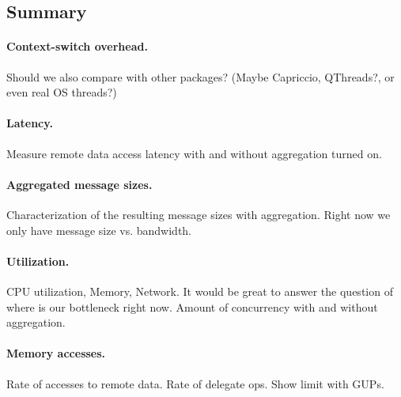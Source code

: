 \subsection{Summary}

\paragraph{Context-switch overhead.} Should we also compare with other packages? (Maybe Capriccio, QThreads?, or even real OS threads?)

\paragraph{Latency.} Measure remote data access latency with and without aggregation turned on.

\paragraph{Aggregated message sizes.} Characterization of the resulting message sizes with aggregation. Right now we only have message size vs. bandwidth.

\paragraph{Utilization.} CPU utilization, Memory, Network. It would be great to answer the question of where is our bottleneck right now. Amount of concurrency with and without aggregation. 

\paragraph{Memory accesses.} Rate of accesses to remote data. Rate of delegate ops. Show limit with GUPs.





